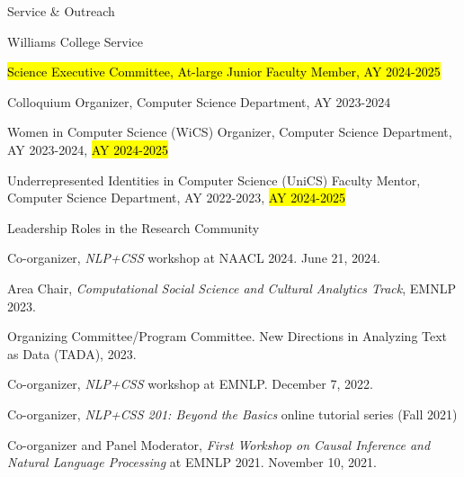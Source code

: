 \documentclass{resume} %
\begin{document}

\begin{rSection}{Service \& Outreach}

\begin{rSubsection}{Williams College Service}{}{}{}
\item \hl{Science Executive Committee, At-large Junior Faculty Member, AY 2024-2025}
\item Colloquium Organizer, Computer Science Department, AY 2023-2024
\item Women in Computer Science (WiCS) Organizer, Computer Science Department, AY 2023-2024, \hl{AY 2024-2025}
\item Underrepresented Identities in Computer Science (UniCS) Faculty Mentor, Computer Science Department, AY 2022-2023, \hl{AY 2024-2025}
\end{rSubsection}

\begin{rSubsection}{Leadership Roles in the Research Community}{}{}{}
\item Co-organizer, \emph{NLP+CSS} workshop at NAACL 2024.  June 21, 2024.
\item Area Chair, \emph{Computational Social Science and Cultural Analytics Track}, EMNLP 2023.
\item Organizing Committee/Program Committee. New Directions in Analyzing Text as Data (TADA), 2023.
\item Co-organizer, \emph{NLP+CSS} workshop at EMNLP. December 7, 2022. 
\item Co-organizer, \emph{NLP+CSS 201: Beyond the Basics} online tutorial series (Fall 2021)
\item Co-organizer and Panel Moderator, \emph{First Workshop on Causal Inference and Natural Language Processing} at EMNLP 2021. November 10, 2021.
\end{rSubsection}


\end{rSection}
\end{document}
